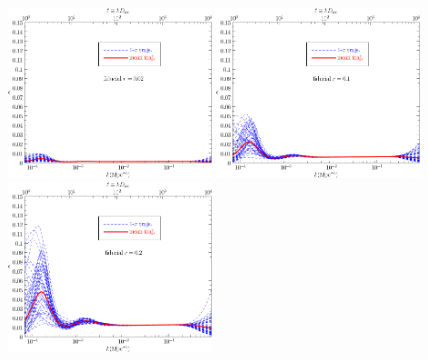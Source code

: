 \documentclass[11pt]{article}
\def \halffigwidth{0.48\textwidth}
\begin{document}
\begin{figure}
  \includegraphics[width=\halffigwidth]{nobicep_spline0_p11_r0d02_eps_traj.pdf}%
  \includegraphics[width=\halffigwidth]{nobicep_spline0_p11_r0d1_eps_traj.pdf} 
  \includegraphics[width=\halffigwidth]{nobicep_spline0_p11_r0d2_eps_traj.pdf}%

\end{figure}
\end{document}
